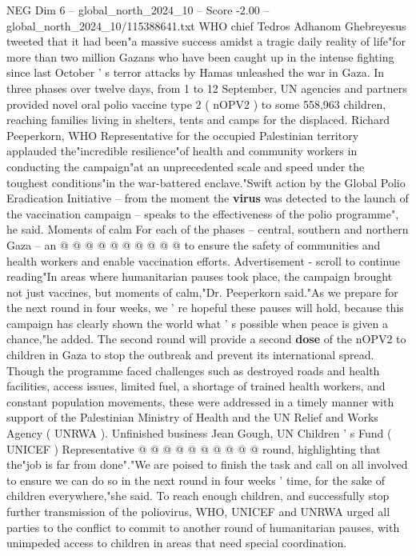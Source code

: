 \begin{textsample}{NEG Dim 6 – global\_north\_2024\_10 – Score -2.00 – global\_north\_2024\_10/115388641.txt}  \label{ex:f6_neg_046}
WHO chief Tedros Adhanom Ghebreyesus tweeted that it had been"a massive success amidst a tragic daily reality of life"for more than two million Gazans who have been caught up in the intense fighting since last October ' s terror attacks by Hamas unleashed the war in Gaza.
In three phases over twelve days, from 1 to 12 September, UN agencies and partners provided novel oral polio vaccine type 2 ( nOPV2 ) to some 558,963 children, reaching families living in shelters, tents and camps for the displaced.
Richard Peeperkorn, WHO Representative for the occupied Palestinian territory applauded the"incredible resilience"of health and community workers in conducting the campaign"at an unprecedented scale and speed under the toughest conditions"in the war-battered enclave."Swift action by the Global Polio Eradication Initiative -- from the moment the \textbf{virus} was detected to the launch of the vaccination campaign -- speaks to the effectiveness of the polio programme", he said.
Moments of calm For each of the phases -- central, southern and northern Gaza -- an @ @ @ @ @ @ @ @ @ @ to ensure the safety of communities and health workers and enable vaccination efforts.
Advertisement - scroll to continue reading"In areas where humanitarian pauses took place, the campaign brought not just vaccines, but moments of calm,"Dr.
Peeperkorn said."As we prepare for the next round in four weeks, we ' re hopeful these pauses will hold, because this campaign has clearly shown the world what ' s possible when peace is given a chance,"he added.
The second round will provide a second \textbf{dose} of the nOPV2 to children in Gaza to stop the outbreak and prevent its international spread.
Though the programme faced challenges such as destroyed roads and health facilities, access issues, limited fuel, a shortage of trained health workers, and constant population movements, these were addressed in a timely manner with support of the Palestinian Ministry of Health and the UN Relief and Works Agency ( UNRWA ).
Unfinished business Jean Gough, UN Children ' s Fund ( UNICEF ) Representative @ @ @ @ @ @ @ @ @ @ round, highlighting that the"job is far from done"."We are poised to finish the task and call on all involved to ensure we can do so in the next round in four weeks ' time, for the sake of children everywhere,"she said.
To reach enough children, and successfully stop further transmission of the poliovirus, WHO, UNICEF and UNRWA urged all parties to the conflict to commit to another round of humanitarian pauses, with unimpeded access to children in areas that need special coordination.

\end{textsample}
